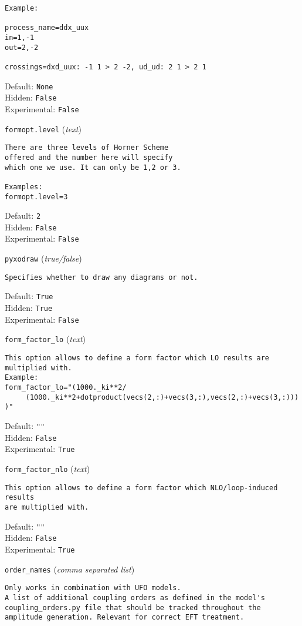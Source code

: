 \begin{basedescript}{\desclabelstyle{\pushlabel}}
\begin{verbatim}
Example:

process_name=ddx_uux
in=1,-1
out=2,-2

crossings=dxd_uux: -1 1 > 2 -2, ud_ud: 2 1 > 2 1
\end{verbatim}
Default: \verb|None|
\\Hidden: \verb|False|
\\Experimental: \verb|False|
\\\item[\colorbox{gray!30}{\texttt{formopt.level}}] (\textit{text})
\begin{verbatim}
There are three levels of Horner Scheme
offered and the number here will specify
which one we use. It can only be 1,2 or 3.

Examples:
formopt.level=3
\end{verbatim}
Default: \verb|2|
\\Hidden: \verb|False|
\\Experimental: \verb|False|
\\\item[\colorbox{gray!30}{\texttt{pyxodraw}}] (\textit{true/false})
\begin{verbatim}
Specifies whether to draw any diagrams or not.
\end{verbatim}
Default: \verb|True|
\\Hidden: \verb|True|
\\Experimental: \verb|False|
\\\item[\colorbox{gray!30}{\texttt{form\_factor\_lo}}] (\textit{text})
\begin{verbatim}
This option allows to define a form factor which LO results are
multiplied with.
Example:
form_factor_lo="(1000._ki**2/
     (1000._ki**2+dotproduct(vecs(2,:)+vecs(3,:),vecs(2,:)+vecs(3,:)))
)"
\end{verbatim}
Default: \verb|""|
\\Hidden: \verb|False|
\\Experimental: \verb|True|
\\\item[\colorbox{gray!30}{\texttt{form\_factor\_nlo}}] (\textit{text})
\begin{verbatim}
This option allows to define a form factor which NLO/loop-induced results
are multiplied with.
\end{verbatim}
Default: \verb|""|
\\Hidden: \verb|False|
\\Experimental: \verb|True|
\\\item[\colorbox{gray!30}{\texttt{order\_names}}] (\textit{comma separated list})
\begin{verbatim}
Only works in combination with UFO models.
A list of additional coupling orders as defined in the model's
coupling_orders.py file that should be tracked throughout the
amplitude generation. Relevant for correct EFT treatment.


\end{verbatim}
\end{basedescript}

